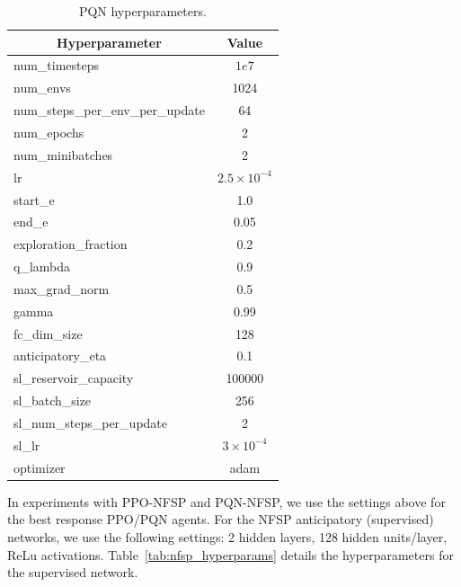 \begin{table}[htbp]
    \caption{PQN hyperparameters.}
    \begin{center}
        \begin{tabular}{lc}
        \hline
            \multicolumn{1}{c}{Hyperparameter} & \multicolumn{1}{c}{Value} \\ \hline
            num\_timesteps & $1e7$ \\
            num\_envs & 1024 \\
            num\_steps\_per\_env\_per\_update & 64 \\
            num\_epochs & 2 \\
            num\_minibatches & 2 \\
            lr & $2.5\times10^{-4}$ \\
            start\_e & 1.0 \\
            end\_e & 0.05 \\
            exploration\_fraction & 0.2 \\
            q\_lambda & 0.9 \\
            max\_grad\_norm & 0.5 \\
            gamma & 0.99 \\
            fc\_dim\_size & 128 \\
            anticipatory\_eta & 0.1 \\
            sl\_reservoir\_capacity & 100000 \\
            sl\_batch\_size & 256 \\
            sl\_num\_steps\_per\_update & 2 \\
            sl\_lr & $3\times10^{-4}$ \\
            optimizer & adam \\
            \hline
        \end{tabular}
    \end{center}
    \label{tab:pqn_hyperparams}
\end{table}

In experiments with PPO-NFSP and PQN-NFSP, we use the settings above for the best response PPO/PQN agents. For the NFSP anticipatory (supervised) networks, we use the following settings: 2 hidden layers, 128 hidden units/layer, ReLu activations. Table~\ref{tab:nfsp_hyperparams} details the hyperparameters for the supervised network.

